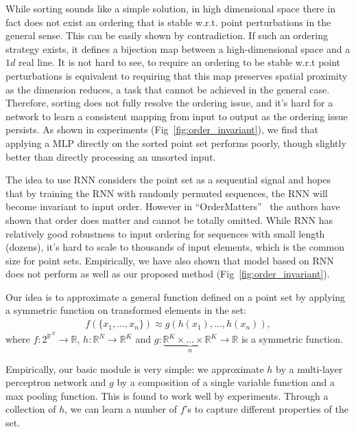While sorting sounds like a simple solution, in high dimensional space there in fact does not exist an ordering that is stable w.r.t. point perturbations in the general sense. This can be easily shown by contradiction. If such an ordering strategy exists, it defines a bijection map between a high-dimensional space and a $1d$ real line. It is not hard to see, to require an ordering to be stable w.r.t point perturbations is equivalent to requiring that this map preserves spatial proximity as the dimension reduces, a task that cannot be achieved in the general case. Therefore, sorting does not fully resolve the ordering issue, and it's hard for a network to learn a consistent mapping from input to output as the ordering issue persists. As shown in experiments (Fig~\ref{fig:order_invariant}), we find that applying a MLP directly on the sorted point set performs poorly, though slightly better than directly processing an unsorted input.

The idea to use RNN considers the point set as a sequential signal and hopes that by training the RNN with randomly permuted sequences, the RNN will become invariant to input order. However in ``OrderMatters''~\cite{vinyals2015order} the authors have shown that order does matter and cannot be totally omitted. While RNN has relatively good robustness to input ordering for sequences with small length (dozens), it's hard to scale to thousands of input elements, which is the common size for point sets. Empirically, we have also shown that model based on RNN does not perform as well as our proposed method (Fig~\ref{fig:order_invariant}).

Our idea is to approximate a general function defined on a point set by applying a symmetric function on transformed elements in the set: 
\begin{align}
    f(\{x_1, \dots, x_n\})\approx g(h(x_1), \dots, h(x_n)),
    \label{eq:approx}
\end{align}
where $f:2^{\mathbb{R}^N} \rightarrow \mathbb{R}$, $h: \mathbb{R}^N\rightarrow \mathbb{R}^K$ and $g:\underbrace{\mathbb{R}^K\times \dots \times \mathbb{R}^K}_n \rightarrow \mathbb{R}$ is a symmetric function.

Empirically, our basic module is very simple: we approximate $h$ by a multi-layer perceptron network and $g$ by a composition of a single variable function and a max pooling function. This is found to work well by experiments. Through a collection of $h$, we can learn a number of $f$'s to capture different properties of the set. %

